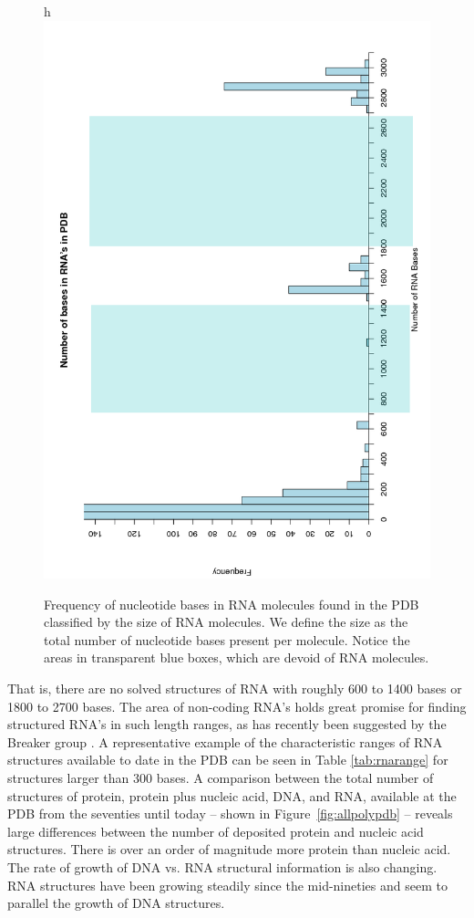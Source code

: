 \begin{figure}{h}
\centering
\includegraphics[scale=0.50, angle=-90]{Chapter2/histogram.png}
\caption{Frequency of  nucleotide bases in RNA molecules  found in the
  PDB classified by  the size of RNA molecules. We  define the size as
  the total  number of nucleotide  bases present per  molecule. Notice
  the  areas  in  transparent  blue  boxes, which  are  devoid of  RNA
  molecules.}
  \label{fig:rnaranges}
\end{figure}

That is,  there are no  solved structures of  RNA with roughly  600 to
1400 bases or 1800 to 2700  bases.  The area of non-coding RNA's holds
great promise for  finding structured RNA's in such  length ranges, as
has recently been suggested  by the Breaker group \cite{weinberg2009}.
A  representative   example  of  the  characteristic   ranges  of  RNA
structures  available  to  date  in  the  PDB can  be  seen  in  Table
\ref{tab:rnarange} for structures larger  than 300 bases. A comparison
between  the  total number  of  structures  of  protein, protein  plus
nucleic acid,  DNA, and RNA, available  at the PDB  from the seventies
until today  -- shown in Figure~\ref{fig:allpolypdb}  -- reveals large
differences between  the number of deposited protein  and nucleic acid
structures.  There  is over  an order of  magnitude more  protein than
nucleic  acid.  The  rate  of   growth  of  DNA  vs.   RNA  structural
information  is  also  changing.  RNA  structures  have  been  growing
steadily since the mid-nineties and seem to parallel the growth of DNA
structures.

